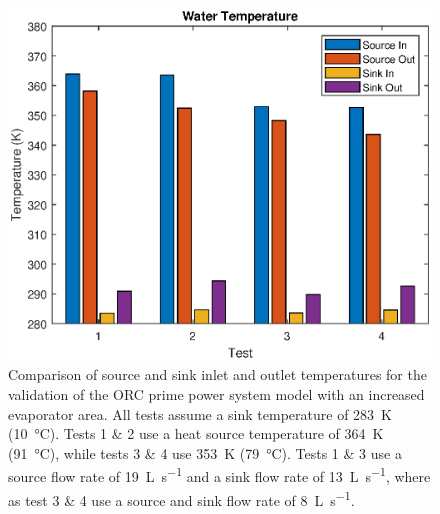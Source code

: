 \begin{figure}[h]
	\centering
	
	\includegraphics[width=\textwidth]{figures/VerificationWaterTemp02}
	
	\caption{Comparison of source and sink inlet and outlet temperatures for the validation of the ORC prime power system model with an increased evaporator area. All tests assume a sink temperature of \SI{283}{\kelvin} (\SI{10}{\degreeCelsius}). Tests 1 \& 2 use a heat source temperature of \SI{364}{\kelvin} (\SI{91}{\degreeCelsius}), while tests 3 \& 4 use \SI{353}{\kelvin} (\SI{79}{\degreeCelsius}). Tests 1 \& 3 use a source flow rate of \SI{19}{\liter\per\second} and a sink flow rate of \SI{13}{\liter\per\second}, where as test 3 \& 4 use a source and sink flow rate of \SI{8}{\liter\per\second}.
	}
	\label{fig:verificationWaterTemp02}
\end{figure}